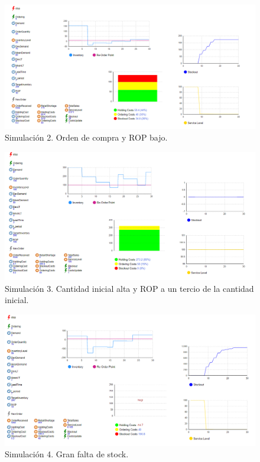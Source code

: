 \begin{figure}[H]
    \includegraphics[width=\linewidth]{images/img2invent}
    \caption{Simulación 2. Orden de compra y ROP bajo.}
\end{figure}

\begin{figure}[H]
    \includegraphics[width=\linewidth]{images/img3invent}
    \caption{Simulación 3. Cantidad inicial alta y ROP a un tercio de la cantidad inicial.}
\end{figure}

\begin{figure}[H]
    \includegraphics[width=\linewidth]{images/img4invent}
    \caption{Simulación 4. Gran falta de stock.}
\end{figure}

